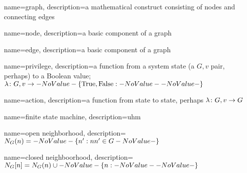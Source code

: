 
{
  name=graph,
  description={a mathematical construct consisting of nodes and connecting edges}
}

{
  name=node,
  description={a basic component of a graph}
}

{
  name=edge,
  description={a basic component of a graph}
}

{
  name=privilege,
  description={a function from a system state (a $G, v$ pair, perhaps) to a Boolean value; $\Function{G, v}{\SetBoolean}$}
}

{
  name=action,
  description={a function from state to state, perhaps $\Function{G, v}{G}$}
}

{
  name=finite state machine,
  description={uhm}
}


{
  name=open neighborhood,
  description={$\OpenNeighborhood{n}[G] = \Set{n^\prime}[nn^\prime \in G]$}
}

{
  name=closed neighboorhood,
  description={$\ClosedNeighborhood{n}[G] = \OpenNeighborhood{n}[G] \cup \Set{n}$}
}

